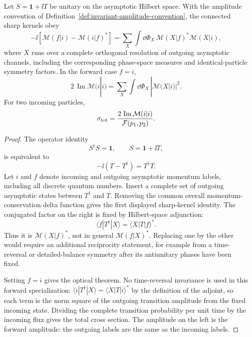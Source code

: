 \begin{theorem}
\label{thm:sharp-kernel-unitarity-optical-theorem}
Let \(S=\mathbf 1+\ii T\) be unitary on the asymptotic Hilbert space.  With
the amplitude convention of Definition~\ref{def:invariant-amplitude-convention},
the connected sharp kernels obey
\[
  -\ii\left[
  \mathcal M(f|i)-\mathcal M(i|f)^*
  \right]
  =
  \sum_X
  \int\dd\Phi_X\,
  \mathcal M(X|f)^*\mathcal M(X|i),
\]
where \(X\) runs over a complete orthogonal resolution of outgoing
asymptotic channels, including the corresponding phase-space measures and
identical-particle symmetry factors.  In the forward case \(f=i\),
\[
  2\,\operatorname{Im}\mathcal M(i|i)
  =
  \sum_X
  \int\dd\Phi_X\,|\mathcal M(X|i)|^2 .
\]
For two incoming particles,
\[
  \sigma_{\rm tot}
  =
  \frac{2\,\operatorname{Im}\mathcal M(i|i)}
  {\mathcal F(p_1,p_2)} .
\]
\end{theorem}

\begin{proof}
The operator identity
\[
  S^\dagger S=\mathbf 1,\qquad S=\mathbf 1+\ii T,
\]
is equivalent to
\[
  -\ii(T-T^\dagger)=T^\dagger T .
\]
Let \(i\) and \(f\) denote incoming and outgoing asymptotic momentum labels,
including all discrete quantum numbers.  Insert a complete set of outgoing
asymptotic states between \(T^\dagger\) and \(T\).  Removing the common
overall momentum-conservation delta function gives the first displayed
sharp-kernel identity.
The conjugated factor on the right is fixed by Hilbert-space adjunction:
\[
  \langle f|T^\dagger|X\rangle
  =
  \langle X|T|f\rangle^* .
\]
Thus it is \(\mathcal M(X|f)^*\), not in general
\(\mathcal M(f|X)^*\).  Replacing one by the other would require an additional
reciprocity statement, for example from a time-reversal or detailed-balance
symmetry after its antiunitary phases have been fixed.

Setting \(f=i\) gives the optical theorem.
No time-reversal invariance is used in this forward specialization:
\(\langle i|T^\dagger|X\rangle=\langle X|T|i\rangle^*\) by the definition of
the adjoint, so each term is the norm square of the outgoing transition
amplitude from the fixed incoming state.  Dividing the complete transition
probability per unit time by the incoming flux gives the total cross section.
The amplitude on the left is the forward amplitude: the outgoing labels are
the same as the incoming labels.
\end{proof}

